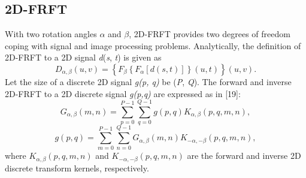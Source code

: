 \documentclass[journal]{IEEEtran}
\begin{document}
\subsection{2D-FRFT}
With two rotation angles $\alpha$ and $\beta$, 2D-FRFT provides two degrees of freedom coping with signal and image processing problems. Analytically, the definition of 2D-FRFT to a 2D signal \emph{d}(\emph{s}, \emph{t}) is given as
\begin{equation}
{D_{\alpha ,\beta }}(u,v) = \left\{ {{F_\beta }\left\{ {{F_\alpha }\left[ {d(s,t)} \right]} \right\}(u,t)} \right\}(u,v).
\end{equation}
Let the size of a discrete 2D signal \emph{g(p, q)} be (\emph{P}, \emph{Q}). The forward and inverse 2D-FRFT to a 2D discrete signal \emph{g(p,q)} are expressed as in [19]:
\begin{equation}
{G_{\alpha ,\beta}}(m,n) = \sum\limits_{p = 0}^{P - 1} {\sum\limits_{q = 0}^{Q - 1} {g(p,q)} } {K_{\alpha ,\beta }}(p,q,m,n),
\end{equation}
\begin{equation}
g(p,q) = \sum\limits_{m = 0}^{P - 1} {\sum\limits_{n = 0}^{Q - 1} {{G_{\alpha ,\beta}}(m,n)} } {K_{ - \alpha , - \beta }}(p,q,m,n),
\end{equation}
where ${K_{\alpha ,\beta}}(p,q,m,n)$ and ${K_{-\alpha ,-\beta}}(p,q,m,n)$ are the forward and inverse 2D discrete transform kernels, respectively.
\end{document}
